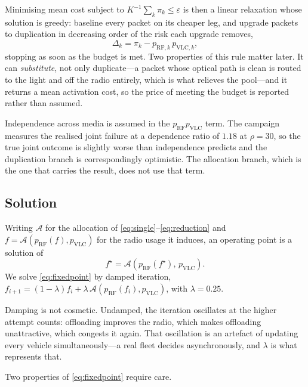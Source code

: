 Minimising mean cost subject to
$K^{-1}\sum_k \pi_k \le \varepsilon$ is then a linear relaxation whose solution
is greedy: baseline every packet on its cheaper leg, and upgrade packets to
duplication in decreasing order of the risk each upgrade removes,
\begin{equation}
  \Delta_k = \pi_k - p_{\mathrm{RF},k}\,p_{\mathrm{VLC},k},
  \label{eq:reduction}
\end{equation}
stopping as soon as the budget is met. Two properties of this rule matter
later. It can \emph{substitute}, not only duplicate---a packet whose optical
path is clean is routed to the light and off the radio entirely, which is what
relieves the pool---and it returns a mean activation cost, so the price of
meeting the budget is reported rather than assumed.

Independence across media is assumed in the $p_{\mathrm{RF}}p_{\mathrm{VLC}}$
term. The campaign measures the realised joint failure at a dependence ratio of
$1.18$ at $\rho = 30$, so the true joint outcome is slightly worse than
independence predicts and the duplication branch is correspondingly optimistic.
The allocation branch, which is the one that carries the result, does not use
that term.

\subsection{Solution}

Writing $\mathcal{A}$ for the allocation of \eqref{eq:single}--\eqref{eq:reduction}
and $f = \mathcal{A}\!\left(p_{\mathrm{RF}}(f), p_{\mathrm{VLC}}\right)$ for the
radio usage it induces, an operating point is a solution of
\begin{equation}
  f^{\star} = \mathcal{A}\!\left(p_{\mathrm{RF}}(f^{\star}),\, p_{\mathrm{VLC}}\right).
  \label{eq:fixedpoint}
\end{equation}
We solve \eqref{eq:fixedpoint} by damped iteration,
$f_{i+1} = (1-\lambda) f_i + \lambda \, \mathcal{A}(p_{\mathrm{RF}}(f_i), p_{\mathrm{VLC}})$,
with $\lambda = 0.25$.

Damping is not cosmetic. Undamped, the iteration oscillates at the higher
attempt counts: offloading improves the radio, which makes offloading
unattractive, which congests it again. That oscillation is an artefact of
updating every vehicle simultaneously---a real fleet decides asynchronously,
and $\lambda$ is what represents that.

Two properties of \eqref{eq:fixedpoint} require care.


